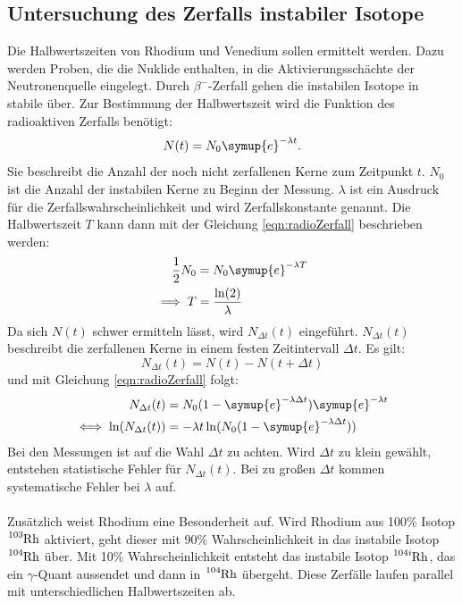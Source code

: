 \subsection{Untersuchung des Zerfalls instabiler Isotope}
Die Halbwertszeiten von Rhodium und Venedium sollen ermittelt werden.
Dazu werden Proben, die die Nuklide enthalten, in die Aktivierungsschächte der Neutronenquelle eingelegt.
Durch $\beta^-$-Zerfall gehen die instabilen Isotope in stabile über.
Zur Bestimmung der Halbwertszeit wird die Funktion des radioaktiven Zerfalls benötigt:
\begin{equation}\label{eqn:radioZerfall}
    N(t) = N_0 \symup{e} ^{-\lambda t} .
\end{equation}
Sie beschreibt die Anzahl der noch nicht zerfallenen Kerne zum Zeitpunkt $t$.
$N_0$ ist die Anzahl der instabilen Kerne zu Beginn der Messung.
$\lambda$ ist ein Ausdruck für die Zerfallswahrscheinlichkeit und wird Zerfallskonstante genannt.
Die Halbwertszeit $T$ kann dann mit der Gleichung \eqref{eqn:radioZerfall} beschrieben werden:
\begin{align}
    \frac{1}{2} N_0 & = N_0 \symup{e}^{-\lambda T} \\* \label{eqn:halbwertszeit}
    \implies T & = \frac{\ln(2)}{\lambda} 
\end{align}
Da sich $N(t)$ schwer ermitteln lässt, wird $N_{\Delta t}(t)$ eingeführt.
$N_{\Delta t}(t)$ beschreibt die zerfallenen Kerne in einem festen Zeitintervall $\Delta t$.
Es gilt:
\begin{equation*}
    N_{\Delta t}(t) = N(t) - N(t + \Delta t)
\end{equation*}
und mit Gleichung \eqref{eqn:radioZerfall} folgt:
\begin{align*}
    N_{\Delta t}(t) & = N_0 (1 - \symup{e}^{-\lambda\Delta t}) \symup{e}^{-\lambda t}\\
    \iff \ln(N_{\Delta t}(t)) & = -\lambda t \ln(N_0(1 - \symup{e}^{-\lambda\Delta t}))
\end{align*}
Bei den Messungen ist auf die Wahl $\Delta t $ zu achten.
Wird $\Delta t $ zu klein gewählt, entstehen statistische Fehler für $N_{\Delta t}(t)$.
Bei zu großen $\Delta t$ kommen systematische Fehler bei $\lambda$ auf.\\
\\
Zusätzlich weist Rhodium eine Besonderheit auf.
Wird Rhodium aus 100\% Isotop $\ce{^{103}Rh}$ aktiviert, geht dieser mit 90\% Wahrscheinlichkeit in das instabile Isotop $\ce{^{104}Rh}$ über.
Mit 10\% Wahrscheinlichkeit entsteht das instabile Isotop $\ce{^{104i}Rh}$, das ein $\gamma$-Quant aussendet und dann in $\ce{^{104}Rh}$ übergeht.
Diese Zerfälle laufen parallel mit unterschiedlichen Halbwertszeiten ab.
